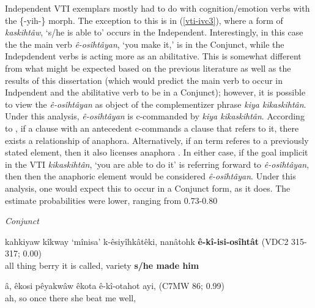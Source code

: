     Independent VTI exemplars mostly had to do with cognition/emotion verbs with the \{-yih-\} morph. The exception to this is in (\ref{vti-ivc3}), where a form of \textit{kaskihtâw}, `s/he is able to' occurs in the Independent. Interestingly, in this case the the main verb \textit{ê-osîhtâyan}, `you make it,' is in the Conjunct, while the Indepdendent verbs is acting more as an abilitative. This is somewhat different from what might be expected based on the previous literature as well as the results of this dissertation (which would predict the main verb to occur in Indpendent and the abilitative verb to be in a Conjunct); however, it is possible to view the \textit{ê-osîhtâyan} as object of the complementizer phrase \textit{kiya kikaskihtân}. Under this analysis, \textit{ê-osîhtâyan} is c-commanded by \textit{kiya kikaskihtân}. According to \cite[129]{Cook2014}, if a clause with an antecedent c-commands a clause that refers to it, there exists a relationship of anaphora. Alternatively, if an term referes to a previously stated element, then it also licenses anaphora \cite[129]{Cook2014}. In either case, if the goal implicit in the VTI \textit{kikaskihtân}, `you are able to do it' is referring forward to \textit{ê-osîhtâyan}, then then the anaphoric element would be considered \textit{ê-osîhtâyan}. Under this analysis, one would expect this to occur in a Conjunct form, as it does. The estimate probabilities were lower, ranging from 0.73-0.80
\vspace{5mm}
    
    \textit{Conjunct}
    \begin{exe}
    \ex 
    \gll kahkiyaw kîkway `mînisa' k-êsiyîhkâtêki, nanâtohk \textbf{ê-kî-isi-osîhtât} \tiny{(VDC2 315-317; 0.00)} \\
         all thing berry {it is called}, variety {\textbf{s/he made him}} \\
    \label{vti-ivc6}
    \end{exe}

    \begin{exe}
    \ex 
    \gll â, êkosi pêyakwâw êkota ê-kî-otahot ayi, \tiny{(C7MW 86; 0.99)}\\
        ah, so once there  {she beat me} well,\\
    \label{vti-ivc8}
    \end{exe}
    
